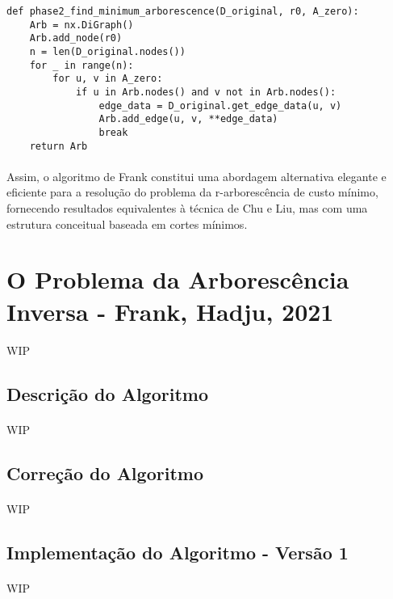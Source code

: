 \documentclass[12pt,a4paper]{article}
\begin{document}
\begin{verbatim}
def phase2_find_minimum_arborescence(D_original, r0, A_zero):
    Arb = nx.DiGraph()
    Arb.add_node(r0)
    n = len(D_original.nodes())
    for _ in range(n):
        for u, v in A_zero:
            if u in Arb.nodes() and v not in Arb.nodes():
                edge_data = D_original.get_edge_data(u, v)
                Arb.add_edge(u, v, **edge_data)
                break
    return Arb
\end{verbatim}

\paragraph{}
Assim, o algoritmo de Frank constitui uma abordagem alternativa elegante e eficiente para a resolução do problema da r-arborescência de custo mínimo, fornecendo resultados equivalentes à técnica de Chu e Liu, mas com uma estrutura conceitual baseada em cortes mínimos.


\section{O Problema da Arborescência Inversa - Frank, Hadju, 2021}
\paragraph{}
WIP

\subsection{Descrição do Algoritmo}
\paragraph{}
WIP

\subsection{Correção do Algoritmo}
\paragraph{}
WIP

\subsection{Implementação do Algoritmo - Versão 1}
\paragraph{}
WIP
\end{document}
